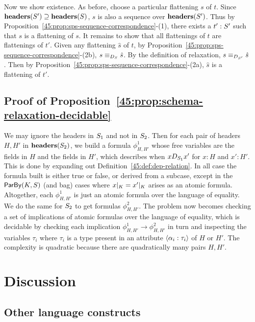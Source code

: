Now we show existence.
As before, choose a particular flattening $s$ of $t$.
Since $\headers(\ss') \supseteq \headers(\ss)$,
$s$ is also a sequence over $\headers(\ss')$.
Thus by Proposition~\ref{45:prop:sps-sequence-correspondence}-(1),
there exists a $t': \ss'$ such that $s$ is a flattening
of $s$.
It remains to show that all flattenings of $t$ are flattenings of $t'$.
Given any flattening $\hat{s}$ of $t$,
by Proposition~\ref{45:prop:sps-sequence-correspondence}-(2b),
$s \equiv_{D_{\ss}} \hat{s}$.
By the definition of relaxation,
$s \equiv_{D_{\ss'}} \hat{s}$.
Then by Proposition~\ref{45:prop:sps-sequence-correspondence}-(2a),
$\hat{s}$ is a flattening of $t'$.

\subsection*{Proof of Proposition~\ref{45:prop:schema-relaxation-decidable}}

We may ignore the headers in $\ss_1$ and not in $\ss_2$.
Then for each pair of headers $H, H'$ in $\headers(\ss_2)$,
we build a formula $\phi^1_{H, H'}$ whose free variables are the fields
in $H$ and the fields in $H'$,
which describes when
$x D_{\ss_1} x'$ for $x : H$ and $x' : H'$.
This is done by expanding out Definition~\ref{45:def:dep-relation}.
In all case the formula built is either true or false, or derived
from a subcase,
except in the $\keyby{K}{S}$ (and bag) cases where
$\tuprestrict{x}{K} = \tuprestrict{x'}{K}$ arises as an atomic
formula.
Altogether, each $\phi^1_{H, H'}$ is just an atomic formula over the
language of equality.
We do the same for $\ss_2$ to get formulas $\phi^2_{H, H'}$.
The problem now becomes checking a set of implications
of atomic formulas over the language of equality, which is
decidable by checking each implication
$\phi^1_{H, H'} \to \phi^2_{H, H'}$
in turn
and inspecting the variables $\tau_i$ where $\tau_i$ is
a type present in an attribute $\hdrfield{\alpha_i}{\tau_i}$ of $H$ or $H'$.
The complexity is quadratic because there are quadratically many pairs $H, H'$.

\section{Discussion}

\subsection{Other language constructs}

